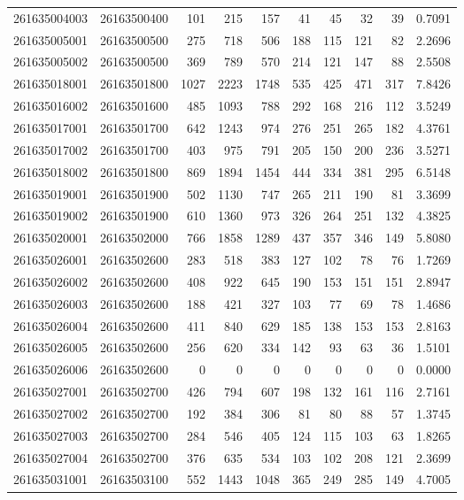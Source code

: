 \documentclass[
  11pt,
]{article}
\begin{document}
\begin{longtable}[t]{llrrrrrrrr}
261635004003 & 26163500400 & 101 & 215 & 157 & 41 & 45 & 32 & 39 & 0.7091\\
261635005001 & 26163500500 & 275 & 718 & 506 & 188 & 115 & 121 & 82 & 2.2696\\
261635005002 & 26163500500 & 369 & 789 & 570 & 214 & 121 & 147 & 88 & 2.5508\\
261635018001 & 26163501800 & 1027 & 2223 & 1748 & 535 & 425 & 471 & 317 & 7.8426\\
261635016002 & 26163501600 & 485 & 1093 & 788 & 292 & 168 & 216 & 112 & 3.5249\\
261635017001 & 26163501700 & 642 & 1243 & 974 & 276 & 251 & 265 & 182 & 4.3761\\
261635017002 & 26163501700 & 403 & 975 & 791 & 205 & 150 & 200 & 236 & 3.5271\\
261635018002 & 26163501800 & 869 & 1894 & 1454 & 444 & 334 & 381 & 295 & 6.5148\\
261635019001 & 26163501900 & 502 & 1130 & 747 & 265 & 211 & 190 & 81 & 3.3699\\
261635019002 & 26163501900 & 610 & 1360 & 973 & 326 & 264 & 251 & 132 & 4.3825\\
261635020001 & 26163502000 & 766 & 1858 & 1289 & 437 & 357 & 346 & 149 & 5.8080\\
261635026001 & 26163502600 & 283 & 518 & 383 & 127 & 102 & 78 & 76 & 1.7269\\
261635026002 & 26163502600 & 408 & 922 & 645 & 190 & 153 & 151 & 151 & 2.8947\\
261635026003 & 26163502600 & 188 & 421 & 327 & 103 & 77 & 69 & 78 & 1.4686\\
261635026004 & 26163502600 & 411 & 840 & 629 & 185 & 138 & 153 & 153 & 2.8163\\
261635026005 & 26163502600 & 256 & 620 & 334 & 142 & 93 & 63 & 36 & 1.5101\\
261635026006 & 26163502600 & 0 & 0 & 0 & 0 & 0 & 0 & 0 & 0.0000\\
261635027001 & 26163502700 & 426 & 794 & 607 & 198 & 132 & 161 & 116 & 2.7161\\
261635027002 & 26163502700 & 192 & 384 & 306 & 81 & 80 & 88 & 57 & 1.3745\\
261635027003 & 26163502700 & 284 & 546 & 405 & 124 & 115 & 103 & 63 & 1.8265\\
261635027004 & 26163502700 & 376 & 635 & 534 & 103 & 102 & 208 & 121 & 2.3699\\
261635031001 & 26163503100 & 552 & 1443 & 1048 & 365 & 249 & 285 & 149 & 4.7005\\

\end{longtable}
\end{document}
